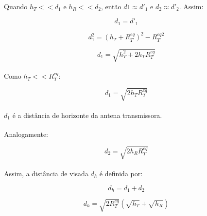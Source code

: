 \paragraph{}Quando $h_T << d_1$ e $h_R << d_2$, então $d1 \approx d'_1$ e $d_2 \approx d'_2$. Assim:

\begin{equation}
    d_1 = d'_1
    \label{2}
\end{equation}

\begin{equation}
    d_1^2 =  (h_T + R_T^{eq})^2 - R_T^{eq2}
    \label{3}
\end{equation}

\begin{equation}    
    d_1 = \sqrt{h_T^2 + 2h_TR_T^{eq}}
    \label{4}
\end{equation}

\paragraph{}Como $h_T << R_T^{eq}$:

\begin{equation}
    d_1 = \sqrt{2h_TR_T^{eq}}
    \label{5}
\end{equation}

\paragraph{}$d_1$ é a distância de horizonte da antena transmissora.

\paragraph{}Analogamente:

\begin{equation}
    d_2 = \sqrt{2h_RR_T^{eq}}
    \label{6}
\end{equation}

\paragraph{}Assim, a distância de visada $d_h$ é definida por:

\begin{equation}
    d_h = d_1 + d_2
    \label{7}
\end{equation}

\begin{equation}
    d_h = \sqrt{2R_T^{eq}}(\sqrt{h_T} + \sqrt{h_R})
    \label{8}
\end{equation}

